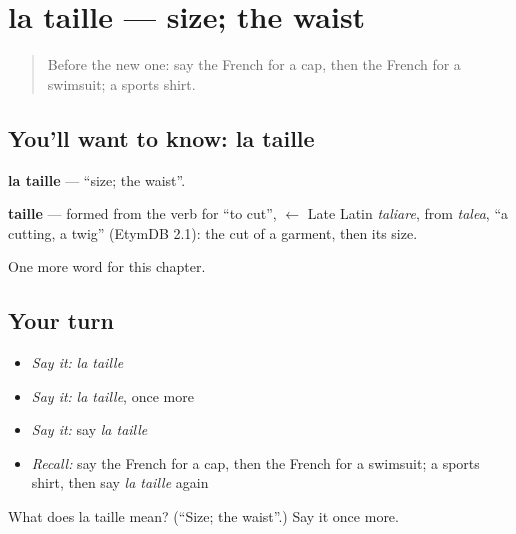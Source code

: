 \section[la taille]{la taille — size; the waist}

\label{lesson:FR-C117-taille}



\begin{quote}
Before the new one: say the French for a cap, then the French for a swimsuit; a sports shirt.
\end{quote}

\subsection*{You'll want to know: la taille}
\textbf{la taille} — \textquotedblleft{}size; the waist\textquotedblright{}.

\begin{cousinweb}
\textbf{taille} — formed from the verb for \textquotedblleft{}to cut\textquotedblright{}, $\leftarrow$ Late Latin \emph{taliare}, from \emph{talea}, \textquotedblleft{}a cutting, a twig\textquotedblright{} (EtymDB 2.1): the cut of a garment, then its size.
\end{cousinweb}

\begin{grammarlens}[title={What you've built}]
One more word for this chapter.
\end{grammarlens}

\subsection*{Your turn}
\begin{itemize}
\raggedright
  \item \emph{Say it:} \emph{la taille}
  \item \emph{Say it:} \emph{la taille}, once more
  \item \emph{Say it:} say \emph{la taille}
  \item \emph{Recall:} say the French for a cap, then the French for a swimsuit; a sports shirt, then say \emph{la taille} again
\end{itemize}

\begin{tcolorbox}[breakable,colback=teal!4,colframe=teal!35!black,title={Before you move on}]
What does la taille mean? (\textquotedblleft{}Size; the waist\textquotedblright{}.) Say it once more.
\end{tcolorbox}

